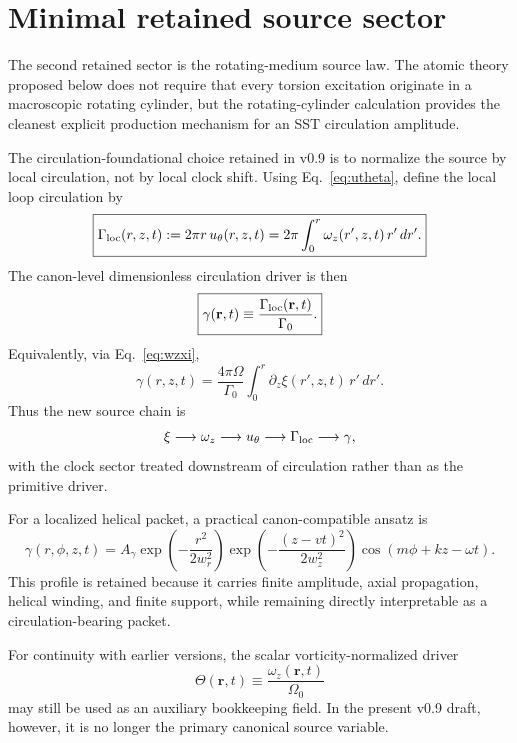 \documentclass[11pt,a4paper]{article}
\begin{document}
\section{Minimal retained source sector}
The second retained sector is the rotating-medium source law. The atomic theory proposed below does not require that every torsion excitation originate in a macroscopic rotating cylinder, but the rotating-cylinder calculation provides the cleanest explicit production mechanism for an SST circulation amplitude.

The circulation-foundational choice retained in v0.9 is to normalize the source by local circulation, not by local clock shift. Using Eq.~\eqref{eq:utheta}, define the local loop circulation by
\begin{equation}
\label{eq:GammaLoc}
\boxed{
\Gamma_{\rm loc}(r,z,t)
:=
2\pi r\,u_\theta(r,z,t)
=
2\pi\int_0^r \omega_z(r',z,t)\,r'\,dr'.
}
\end{equation}
The canon-level dimensionless circulation driver is then
\begin{equation}
\label{eq:gammaDef}
\boxed{
\gamma(\mathbf r,t)
\equiv
\frac{\Gamma_{\rm loc}(\mathbf r,t)}{\Gamma_0}.
}
\end{equation}
Equivalently, via Eq.~\eqref{eq:wzxi},
\begin{equation}
\label{eq:gammaXi}
\gamma(r,z,t)
=
\frac{4\pi\Omega}{\Gamma_0}
\int_0^r \partial_z \xi(r',z,t)\,r'\,dr'.
\end{equation}
Thus the new source chain is
\begin{equation}
\label{eq:source-chain}
\xi \longrightarrow \omega_z \longrightarrow u_\theta \longrightarrow \Gamma_{\rm loc} \longrightarrow \gamma,
\end{equation}
with the clock sector treated downstream of circulation rather than as the primitive driver.

For a localized helical packet, a practical canon-compatible ansatz is
\begin{equation}
\label{eq:gammaPacket}
\gamma(r,\phi,z,t)
=
A_\gamma
\exp\!\left(-\frac{r^2}{2w_r^2}\right)
\exp\!\left(-\frac{(z-vt)^2}{2w_z^2}\right)
\cos\!\left(m\phi+kz-\omega t\right).
\end{equation}
This profile is retained because it carries finite amplitude, axial propagation, helical winding, and finite support, while remaining directly interpretable as a circulation-bearing packet.

For continuity with earlier versions, the scalar vorticity-normalized driver
\begin{equation}
\label{eq:ThetaDef}
\Theta(\mathbf r,t) \equiv \frac{\omega_z(\mathbf r,t)}{\Omega_0}
\end{equation}
may still be used as an auxiliary bookkeeping field. In the present v0.9 draft, however, it is no longer the primary canonical source variable.
\end{document}

